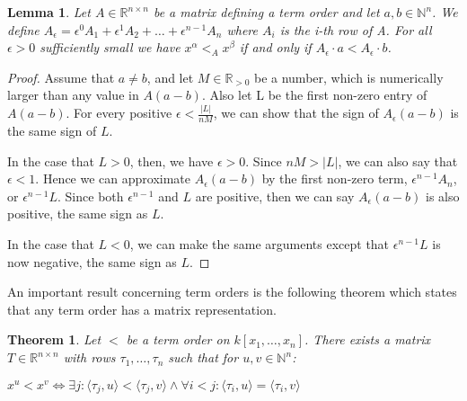 \documentclass[12pt,a4paper]{report}
\newtheorem{theorem}{Theorem}
\newtheorem{lemma}{Lemma}
\begin{document}
\begin{lemma}
Let $A \in \mathbb R^{n \times n}$ be a matrix defining a term order and let $a, b \in \mathbb N^{n}$. We define $A_{\epsilon} = \epsilon ^{0} A_{1} + \epsilon ^{1} A_{2} + \ldots + \epsilon ^{n-1} A_{n}$ where $A_{i}$ is the i-th row of A. For all $\epsilon > 0$ sufficiently small we have $x^{\alpha} <_{A} x^{\beta}$ if and only if $A_{\epsilon} \cdot a < A_{\epsilon} \cdot b$.
\end{lemma}

\begin{proof}
Assume that $a \neq b$, and let $M \in \mathbb R_{>0}$ be a number, which is numerically larger than any value in $A(a-b)$. Also let L be the first non-zero entry of $A(a-b)$. For every positive $\epsilon < \frac{|L|}{nM}$, we can show that the sign of $A_{\epsilon} (a-b)$ is the same sign of $L$.

In the case that $L > 0$, then, we have $\epsilon > 0$. Since $nM > |L|$, we can also say that $\epsilon < 1$. Hence we can approximate $A_{\epsilon} (a-b)$ by the first non-zero term, $\epsilon^{n-1} A_{n}$, or $\epsilon^{n-1} L$. Since both $\epsilon^{n-1}$ and $L$ are positive, then we can say $A_{\epsilon} (a-b)$ is also positive, the same sign as $L$.

In the case that $L < 0$, we can make the same arguments except that $\epsilon^{n-1} L$ is now negative, the same sign as $L$.
\end{proof}

An important result concerning term orders is the following theorem which states that any term order has a matrix representation.

\begin{theorem}\cite{LRobbiano}
Let $<$ be a term order on $k[x_{1}, \ldots ,x_{n}]$. There exists a matrix $T \in \mathbb R^{n \times n}$ with rows $\tau_{1}, \ldots ,\tau_{n}$ such that for $u, v \in \mathbb N^{n}$:

$x^{u} < x^{v} \Leftrightarrow \exists j: \langle \tau_{j}, u \rangle < \langle \tau_{j}, v \rangle \wedge \forall i < j: \langle \tau_{i}, u \rangle = \langle \tau_{i}, v \rangle$
\end{theorem}
\end{document}
